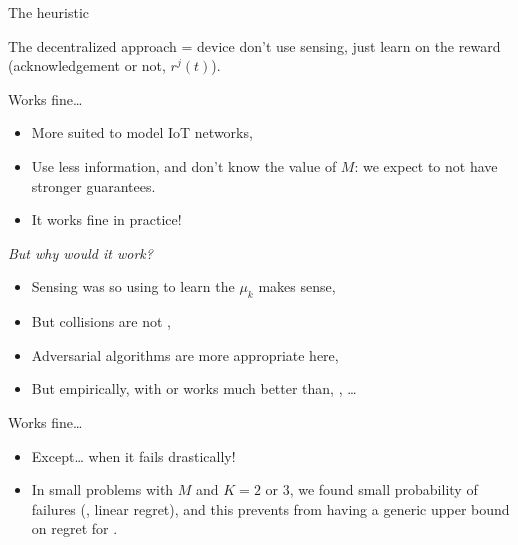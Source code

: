 \documentclass[12pt,english,ignorenonframetext,]{beamer}
\providecommand{\tightlist}{%
  \setlength{\itemsep}{0pt}\setlength{\parskip}{0pt}}
\begin{document}
\begin{frame}[allowframebreaks]{The \Selfish{} heuristic}

The \Selfish{} decentralized approach = device don't use sensing, just
learn on the reward (acknowledgement or not, \(r^j(t)\)).


\begin{block}{Works fine\ldots{}}

\begin{itemize}
\tightlist
\item
  More suited to model IoT networks,
\item
  Use less information, and don't know the value of \(M\): we expect
  \Selfish{} to not have stronger guarantees.
\item
  It works fine in practice!
\end{itemize}

\end{block}

\begin{block}{\emph{But why would it work?}}

\begin{itemize}
\tightlist
\item
  Sensing was \iid{} so using \UCB{} to learn the \(\mu_k\) makes sense,
\item
  But collisions are not \iid,
\item
  Adversarial algorithms are more appropriate here,
\item
  But empirically, \Selfish{} with \UCB{} or \klUCB{} works much better
  than, \eg, \ExpThree\ldots{}
\end{itemize}

\pause

\end{block}

\begin{block}{Works fine\ldots{}}

\begin{itemize}
\tightlist
\item
  Except\ldots{} when it fails drastically! \Sadey[1.3]
\item
  In small problems with \(M\) and \(K = 2\) or \(3\), we found small
  probability of failures (\ie, linear regret), and this prevents from
  having a generic upper bound on regret for \Selfish.
\end{itemize}

\end{block}

\end{frame}
\end{document}
